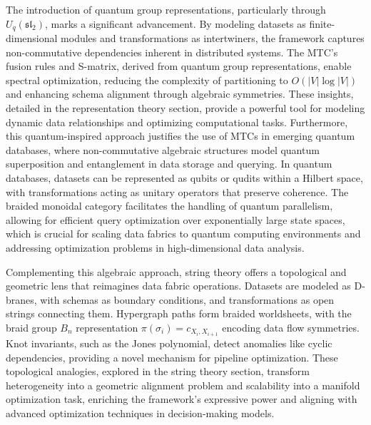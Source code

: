 \documentclass{amsart}
\begin{document}
The introduction of quantum group representations, particularly through \( U_q(\mathfrak{sl}_2) \), marks a significant advancement. By modeling datasets as finite-dimensional modules and transformations as intertwiners, the framework captures non-commutative dependencies inherent in distributed systems. The MTC’s fusion rules and S-matrix, derived from quantum group representations, enable spectral optimization, reducing the complexity of partitioning to \( O(|V| \log |V|) \) and enhancing schema alignment through algebraic symmetries. These insights, detailed in the representation theory section, provide a powerful tool for modeling dynamic data relationships and optimizing computational tasks. Furthermore, this quantum-inspired approach justifies the use of MTCs in emerging quantum databases, where non-commutative algebraic structures model quantum superposition and entanglement in data storage and querying. In quantum databases, datasets can be represented as qubits or qudits within a Hilbert space, with transformations acting as unitary operators that preserve coherence. The braided monoidal category facilitates the handling of quantum parallelism, allowing for efficient query optimization over exponentially large state spaces, which is crucial for scaling data fabrics to quantum computing environments and addressing optimization problems in high-dimensional data analysis.

Complementing this algebraic approach, string theory offers a topological and geometric lens that reimagines data fabric operations. Datasets are modeled as D-branes, with schemas as boundary conditions, and transformations as open strings connecting them. Hypergraph paths form braided worldsheets, with the braid group \( B_n \) representation \( \pi(\sigma_i) = c_{X_i, X_{i+1}} \) encoding data flow symmetries. Knot invariants, such as the Jones polynomial, detect anomalies like cyclic dependencies, providing a novel mechanism for pipeline optimization. These topological analogies, explored in the string theory section, transform heterogeneity into a geometric alignment problem and scalability into a manifold optimization task, enriching the framework’s expressive power and aligning with advanced optimization techniques in decision-making models.
\end{document}
